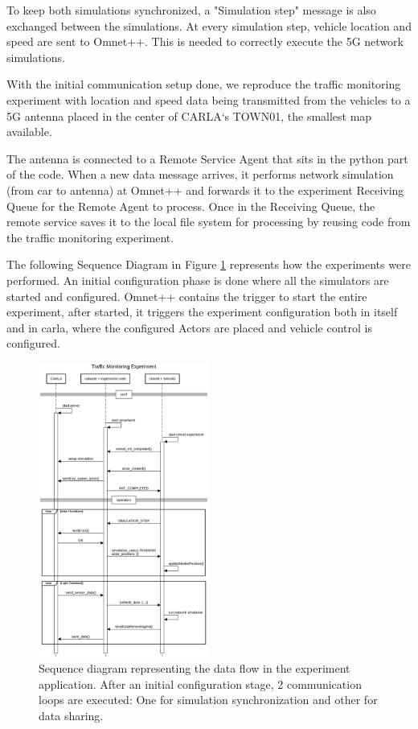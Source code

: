 To keep both simulations synchronized, a "Simulation step" message is also exchanged between the simulations. At every simulation step, vehicle location and speed are sent to Omnet++. This is needed to correctly execute the 5G network simulations.

With the initial communication setup done, we reproduce the traffic monitoring experiment with location and speed data being transmitted from the vehicles to a 5G antenna placed in the center of CARLA`s TOWN01, the smallest map available.

The antenna is connected to a Remote Service Agent that sits in the python part of the code. When a new data message arrives, it performs network simulation (from car to antenna) at Omnet++ and forwards it to the experiment Receiving Queue for the Remote Agent to process. Once in the Receiving Queue, the remote service 
saves it to the local file system for processing by reusing code from the traffic monitoring experiment.

The following Sequence Diagram in Figure \ref{fig:sequence-diagram} represents how the experiments were performed. An initial configuration phase is done where all the simulators are started and configured. Omnet++ contains the trigger to start the entire experiment, after started, it triggers the experiment configuration both in itself and in carla, where the configured Actors are placed and vehicle control is configured.

\begin{figure} [h!]
    \centering
    \includegraphics[width=0.5\textwidth]{parts/figuras/traffic monitoring sequence diagram.png}
    \caption{Sequence diagram representing the data flow in the experiment application. After an initial configuration stage, 2 communication loops are executed: One for simulation synchronization and other for data sharing.}
    \label{fig:sequence-diagram}
\end{figure}

